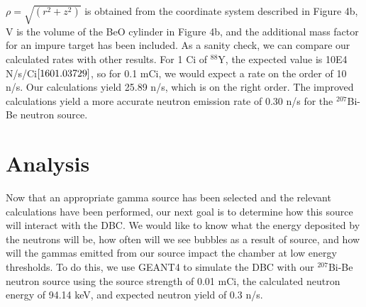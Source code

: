 \documentclass[%
12pt,
twoside,
reprint,
amsmath,amssymb,
aps,
]{article}
\begin{document}
	\noindent $\rho = \sqrt{(r^{2} + z^{2})}$ is obtained from the coordinate system described in Figure 4b, V is the volume of the BeO cylinder in Figure 4b, and the additional mass factor for an impure target has been included. As a sanity check, we can compare our calculated rates with other results. For 1 Ci of $^{88}$Y, the expected value is 10E4 N/s/Ci${\cite{1601.03729}}$, so for 0.1 mCi, we would expect a rate on the order of 10 n/s. Our calculations yield 25.89 n/s, which is on the right order. The improved calculations yield a more accurate neutron emission rate of 0.30 n/s for the $^{207}$Bi-Be neutron source. 

	\section{Analysis}
	\par Now that an appropriate gamma source has been selected and the relevant calculations have been performed, our next goal is to determine how this source will interact with the DBC. We would like to know what the energy deposited by the neutrons will be, how often will we see bubbles as a result of source, and how will the gammas emitted from our source impact the chamber at low energy thresholds. To do this, we use GEANT4 to simulate the DBC with our $^{207}$Bi-Be neutron source using the source strength of 0.01 mCi, the calculated neutron energy of 94.14 keV, and expected neutron yield of 0.3 n/s.
\end{document}
